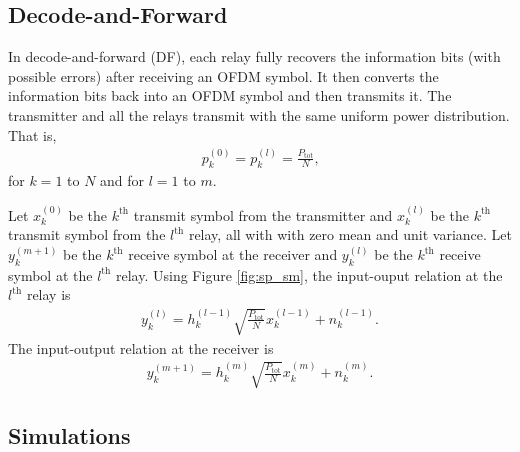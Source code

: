 \documentclass[journal]{IEEEtran}
\begin{document}
\subsection{Decode-and-Forward}
In decode-and-forward (DF), each relay fully recovers the information bits (with possible errors) after receiving an OFDM symbol.  It then converts the information bits back into an OFDM symbol and then transmits it.  The transmitter and all the relays transmit with the same uniform power distribution.  That is,
\begin{eqnarray}
p_k^{(0)} = p_k^{(l)} = \frac{P_{\mbox{tot}}}{N}\mbox{,}
\end{eqnarray}
for $k = 1$ to $N$ and for $l = 1$ to $m$.

Let $x_k^{(0)}$ be the $k^{\mbox{th}}$ transmit symbol from the transmitter and  $x_k^{(l)}$ be the $k^{\mbox{th}}$ transmit symbol from the $l^{\mbox{th}}$ relay, all with with zero mean and unit variance.  Let $y_k^{(m+1)}$ be the $k^{\mbox{th}}$ receive symbol at the receiver and  $y_k^{(l)}$ be the $k^{\mbox{th}}$ receive symbol at the $l^{\mbox{th}}$ relay.  Using Figure \ref{fig:sp_sm}, the input-ouput relation at the $l^{\mbox{th}}$ relay is
\begin{eqnarray}
y_k^{(l)} = h_k^{(l-1)} \sqrt{\frac{P_{\mbox{tot}}}{N}} x_k^{(l-1)} + n_k^{(l-1)} \mbox{.}
\end{eqnarray}
The input-output relation at the receiver is
\begin{eqnarray}
y_k^{(m+1)} =h_k^{(m)}  \sqrt{\frac{P_{\mbox{tot}}}{N}} x_k^{(m)} + n_k^{(m)} \mbox{.}
\end{eqnarray}

\subsection{Simulations}
\label{sec:sp_sims}
\end{document}
